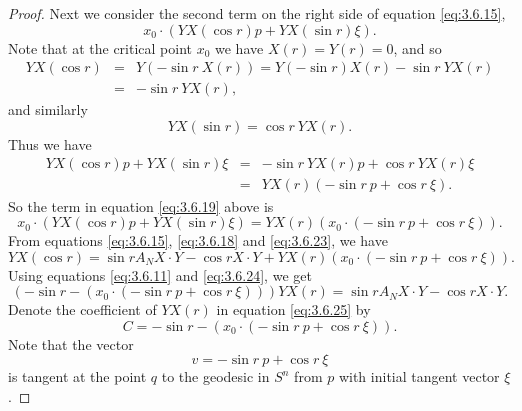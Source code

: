 \documentclass[10pt,a4paper]{amsart}
\begin{document}
\begin{proof}
Next we consider the second term on the right side of equation \eqref{eq:3.6.15},
\begin{equation}
\label{eq:3.6.19}
x_0 \cdot (YX(\cos r) p + YX(\sin r) \xi).
\end{equation}
Note that at the critical point $x_0$ we have $X(r) = Y(r) = 0$, and so
\begin{eqnarray}
\label{eq:3.6.20}
YX(\cos r) &=& Y( - \sin r \ X(r)) = Y(- \sin r) X(r) - \sin r \ YX(r)\\ \nonumber 
&=& - \sin r \ YX(r),
\end{eqnarray}
and similarly
\begin{equation}
\label{eq:3.6.21}
YX(\sin r) = \cos r \ YX(r).
\end{equation}
Thus we have
\begin{eqnarray}
\label{eq:3.6.22}
YX (\cos r) p + YX(\sin r) \xi &=& - \sin r \ YX(r) p + \cos r \ YX(r) \xi \\
 &=& YX(r) ( -\sin r\  p + \cos r\  \xi). \nonumber 
\end{eqnarray}
So the term in equation \eqref{eq:3.6.19} above is
\begin{equation}
\label{eq:3.6.23}
x_0 \cdot (YX(\cos r) p + YX(\sin r) \xi) = YX(r) (x_0 \cdot ( -\sin r\  p + \cos r\  \xi)).
\end{equation}
From equations \eqref{eq:3.6.15}, \eqref{eq:3.6.18} and \eqref{eq:3.6.23}, we have
\begin{equation}
\label{eq:3.6.24}
YX(\cos r) = \sin r A_N X \cdot Y - \cos r X \cdot Y + YX(r) (x_0 \cdot ( -\sin r\  p + \cos r\  \xi)).
\end{equation}
Using equations \eqref{eq:3.6.11} and \eqref{eq:3.6.24}, we get
\begin{equation}
\label{eq:3.6.25}
(- \sin r - (x_0 \cdot ( -\sin r\  p + \cos r\  \xi))) YX(r) = \sin r A_N X \cdot Y - \cos r X \cdot Y.
\end{equation}
Denote the coefficient of $YX(r)$ in equation \eqref{eq:3.6.25} by 
\begin{equation}
\label{eq:3.6.26}
C = - \sin r - (x_0 \cdot ( -\sin r\  p + \cos r\  \xi)).
\end{equation}
Note that the vector 
\begin{equation}
\label{eq:3.6.27}
v =  -\sin r\  p + \cos r\  \xi
\end{equation}
is tangent at the point $q$ to the geodesic in $S^n$ from $p$ with initial tangent vector $\xi$.




\end{proof}
\end{document}
